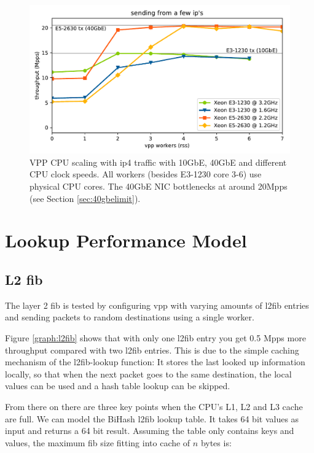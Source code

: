 \begin{figure}[!ht]
\noindent\hspace{0.5mm}\includegraphics[width=\linewidth]{pics/throughput_summary_multicore.pdf}
\caption{VPP CPU scaling with \Ac{ip4} traffic with 10GbE, 40GbE and different CPU clock speeds. All workers (besides E3-1230 core 3-6) use physical CPU cores. The 40GbE NIC bottlenecks at around 20Mpps (see Section \ref{sec:40gbelimit}). }
\label{graph:multicore}
\end{figure}


\section{Lookup Performance Model}



\subsection{L2 \Ac{fib}}

The layer 2 \Ac{fib} is tested by configuring \Ac{vpp} with varying
amounts of l2fib entries and sending packets to random destinations
using a single worker.

Figure \ref{graph:l2fib} shows that with only one l2fib entry you get
0.5 Mpps more throughput compared with two l2fib entries. This is due
to the simple caching mechanism of the l2fib-lookup function: It
stores the last looked up information locally, so that when the next
packet goes to the same destination, the local values can be used and
a hash table lookup can be skipped.

From there on there are three key points when the CPU's L1, L2 and L3
cache are full. We can model the BiHash l2fib lookup table. It takes
64 bit values as input and returns a 64 bit result. Assuming the table
only contains keys and values, the maximum \Ac{fib} size fitting into
cache of $n$ bytes is:

